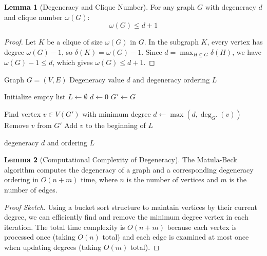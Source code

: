 \documentclass{article}
\theoremstyle{definition}
\newtheorem{lemma}{Lemma}
\begin{document}
\begin{lemma}[Degeneracy and Clique Number]
For any graph $G$ with degeneracy $d$ and clique number $\omega(G)$:
\begin{equation}
\omega(G) \leq d + 1
\end{equation}
\end{lemma}

\begin{proof}
Let $K$ be a clique of size $\omega(G)$ in $G$. In the subgraph $K$, every vertex has degree $\omega(G)-1$, so $\delta(K) = \omega(G)-1$. Since $d = \max_{H \subseteq G} \delta(H)$, we have $\omega(G) - 1 \leq d$, which gives $\omega(G) \leq d + 1$.
\end{proof}

\begin{algorithm}
\caption{Matula-Beck Algorithm for Computing Degeneracy}
\label{alg:matula-beck}
\begin{algorithmic}[1]
    \Require Graph $G = (V, E)$
    \Ensure Degeneracy value $d$ and degeneracy ordering $L$
    
    \State Initialize empty list $L \gets \emptyset$ 
    \State $d \gets 0$ 
    \State $G' \gets G$ 
    
        \State Find vertex $v \in V(G')$ with minimum degree
        \State $d \gets \max(d, \deg_{G'}(v))$ 
        \State Remove $v$ from $G'$
        \State Add $v$ to the beginning of $L$
    \EndWhile
    
    \State \Return degeneracy $d$ and ordering $L$
\end{algorithmic}
\end{algorithm}

\begin{lemma}[Computational Complexity of Degeneracy]
The Matula-Beck algorithm computes the degeneracy of a graph and a corresponding degeneracy ordering in $O(n + m)$ time, where $n$ is the number of vertices and $m$ is the number of edges.
\end{lemma}

\begin{proof}[Proof Sketch]
Using a bucket sort structure to maintain vertices by their current degree, we can efficiently find and remove the minimum degree vertex in each iteration. The total time complexity is $O(n + m)$ because each vertex is processed once (taking $O(n)$ total) and each edge is examined at most once when updating degrees (taking $O(m)$ total).
\end{proof}
\end{document}
